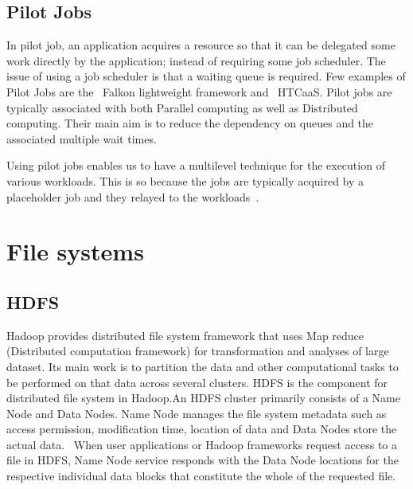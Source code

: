      \pv

\subsection{Pilot Jobs}

In pilot job, an application acquires a resource so that it can be
delegated some work directly by the application; instead of requiring
some job scheduler. The issue of using a job scheduler is that a
waiting queue is required. Few examples of Pilot Jobs are
the~\cite{pilot-job-falkon-paper-2007} Falkon lightweight framework
and~\cite{pilot-job-htcaas-paper-2007} HTCaaS. Pilot jobs are
typically associated with both Parallel computing as well as
Distributed computing. Their main aim is to reduce the dependency on
queues and the associated multiple wait times.

Using pilot jobs enables us to have a multilevel technique for the
execution of various workloads. This is so because the jobs are
typically acquired by a placeholder job and they relayed to the
workloads~\cite{www-pilot-job-paper-2016}.

\section{File systems}
\label{S:o-file-systems}


\subsection{HDFS}
     
     Hadoop provides distributed file system framework that uses Map
     reduce (Distributed computation framework) for transformation and
     analyses of large dataset.  Its main work is to partition the
     data and other computational tasks to be performed on that data
     across several clusters.  HDFS is the component for distributed
     file system in Hadoop.An HDFS cluster primarily consists of a
     Name Node and Data Nodes. Name Node manages the file system
     metadata such as access permission, modification time, location
     of data and Data Nodes store the actual data.   When user
     applications or Hadoop frameworks request access to a file in
     HDFS, Name Node service responds with the Data Node locations for
     the respective individual data blocks that constitute the whole
     of the requested file\cite{www-hdfs}.

